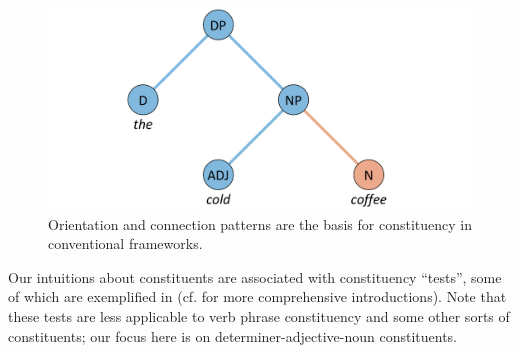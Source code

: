   
\begin{figure}
\includegraphics[width=\textwidth]{figures/Tilsen-img136.png}
\caption{Orientation and connection patterns are the basis for constituency in conventional frameworks.}
\label{fig:6:17}
\end{figure}
 

  Our intuitions about constituents are associated with constituency “tests”, some of which are exemplified in {} (cf. \citealt{Carnie2013,Ouhalla1999} for more comprehensive introductions). Note that these tests are less applicable to verb phrase constituency and some other sorts of constituents; our focus here is on determiner-adjective-noun constituents.

